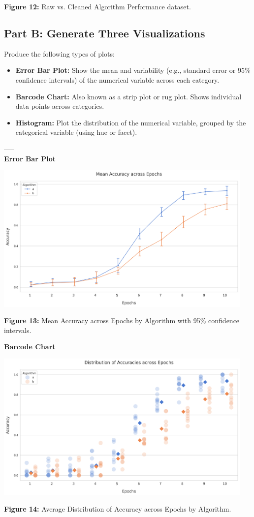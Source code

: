 \begin{center}
    \textbf{Figure 12:} Raw vs. Cleaned Algorithm Performance dataset.
\end{center}
\newpage

\subsection{Part B: Generate Three Visualizations}
Produce the following types of plots:
\begin{itemize}
    \item \textbf{Error Bar Plot:} Show the mean and variability (e.g., standard error or 95\% confidence intervals) of the numerical variable across each category.
    \item \textbf{Barcode Chart:} Also known as a strip plot or rug plot. Shows individual data points across categories.
    \item \textbf{Histogram:} Plot the distribution of the numerical variable, grouped by the categorical variable (using hue or facet).
\end{itemize}
-----\\
\textbf{Error Bar Plot}
\begin{center}
  \includegraphics[width=0.95\textwidth]{figures/algo_accuracy_by_epoch_error_bar_plot.png}
  
  \textbf{Figure 13:} Mean Accuracy across Epochs by Algorithm with 95\% confidence intervals.
\end{center}

\textbf{Barcode Chart}
\begin{center}
  \includegraphics[width=0.95\textwidth]{figures/algo_accuracy_by_epoch_strip_plot.png}
  
  \textbf{Figure 14:} Average Distribution of Accuracy across Epochs by Algorithm.
\end{center}


